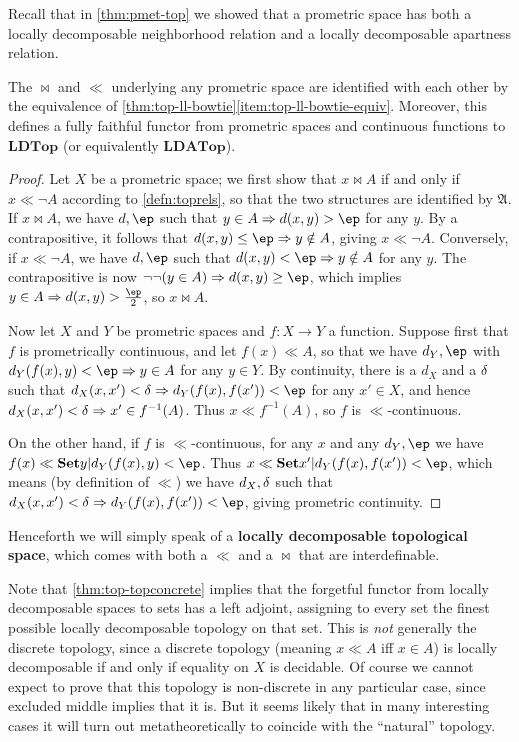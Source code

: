 \documentclass{article}
\def\cpl#1{\neg #1}
\let\implies\Rightarrow
\def\inv{^{-1}}
\def\hfep{\frac{\ep}{2}}
\def\anti{\mathfrak{A}}
\def\LDTop{\mathbf{LDTop}}
\def\LDATop{\mathbf{LDATop}}
\begin{document}
Recall that in \cref{thm:pmet-top} we showed that a prometric space has both a locally decomposable neighborhood relation and a locally decomposable apartness relation.

\begin{thm}\label{thm:promet-top}
  The $\bowtie$ and $\ll$ underlying any prometric space are identified with each other by the equivalence of \cref{thm:top-ll-bowtie}\ref{item:top-ll-bowtie-equiv}.
  Moreover, this defines a fully faithful functor from prometric spaces and continuous functions to $\LDTop$ (or equivalently $\LDATop$).
\end{thm}
\begin{proof}
  Let $X$ be a prometric space; we first show that $x\bowtie A$ if and only if $x\ll \cpl{A}$ according to \cref{defn:toprels}, so that the two structures are identified by $\anti$.
  If $x\bowtie A$, we have $d,\ep$ such that $y\in A \implies d(x,y)>\ep$ for any $y$.
  By a contrapositive, it follows that $d(x,y)\le \ep \implies y\notin A$, giving $x\ll \cpl{A}$.
  Conversely, if $x\ll\cpl{A}$, we have $d,\ep$ such that $d(x,y)< \ep \implies y\notin A$ for any $y$.
  The contrapositive is now $\neg\neg(y\in A) \implies d(x,y)\ge \ep$, which implies $y\in A \implies d(x,y)> \hfep$, so $x\bowtie A$.

  Now let $X$ and $Y$ be prometric spaces and $f:X\to Y$ a function.
  Suppose first that $f$ is prometrically continuous, and let $f(x)\ll A$, so that we have $d_Y,\ep$ with $d_Y(f(x),y)< \ep \implies y\in A$ for any $y\in Y$.
  By continuity, there is a $d_X$ and a $\delta$ such that $d_X(x,x')<\de \implies d_Y(f(x),f(x'))<\ep$ for any $x'\in X$, and hence $d_X(x,x')<\de \implies x'\in f\inv(A)$.
  Thus $x\ll f\inv(A)$, so $f$ is $\ll$-continuous.

  On the other hand, if $f$ is $\ll$-continuous, for any $x$ and any $d_Y,\ep$ we have $f(x)\ll \setof{y|d_Y(f(x),y)<\ep}$.
  Thus $x\ll \setof{x'|d_Y(f(x),f(x'))<\ep}$, which means (by definition of $\ll$) we have $d_X,\delta$ such that $d_X(x,x')<\de \implies d_Y(f(x),f(x'))<\ep$, giving prometric continuity.
\end{proof}

Henceforth we will simply speak of a \textbf{locally decomposable topological space}, which comes with both a $\ll$ and a $\bowtie$ that are interdefinable.

\begin{rmk}
  Note that \cref{thm:top-topconcrete} implies that the forgetful functor from locally decomposable spaces to sets has a left adjoint, assigning to every set the finest possible locally decomposable topology on that set.
  This is \emph{not} generally the discrete topology, since a discrete topology (meaning $x\ll A$ iff $x\in A$) is locally decomposable if and only if equality on $X$ is decidable.
  Of course we cannot expect to prove that this topology is non-discrete in any particular case, since excluded middle implies that it is.
  But it seems likely that in many interesting cases it will turn out metatheoretically to coincide with the ``natural'' topology.
\end{rmk}
\end{document}
